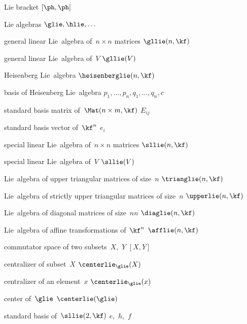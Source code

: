
{Lie bracket}
{$[\ph, \ph]$}

{Lie algebras}
{$\glie, \hlie, \dotsc$}

{general linear Lie~algebra of~$n \times n$ matrices}
{$\gllie(n, \kf)$}

{general linear Lie~algebra of~$V$}
{$\gllie(V)$}

{Heisenberg Lie~algebra}
{$\heisenberglie(n, \kf)$}

{basis of Heisenberg Lie~algebra}
{$p_1, \dotsc, p_n, q_1, \dotsc, q_n, c$}

{standard basis matrix of~$\Mat(n \times m, \kf)$}
{$E_{ij}$}

{standard basis vector of~$\kf^n$}
{$e_i$}

{special linear Lie~algebra of~$n \times n$ matrices}
{$\sllie(n, \kf)$}

{special linear Lie~algebra of~$V$}
{$\sllie(V)$}

{Lie~algebra of upper triangular matrices of size~$n$}
{$\trianglie(n, \kf)$}

{Lie~algebra of strictly upper triangular matrices of size~$n$}
{$\upperlie(n, \kf)$}

{Lie~algebra of diagonal matrices of size~$nn$}
{$\diaglie(n, \kf)$}

{Lie~algebra of affine transformations of~$\kf^n$}
{$\afflie(n, \kf)$}

{commutator space of two subsets~$X$,~$Y$}
{$[X, Y]$}

{centralizer of subset~$X$}
{$\centerlie_{\glie}(X)$}

{centralizer of an element~$x$}
{$\centerlie_{\glie}(x)$}

{center of~$\glie$}
{$\centerlie(\glie)$}

{standard basis of~$\sllie(2, \kf)$}
{$e$,~$h$,~$f$}

